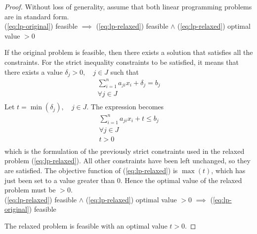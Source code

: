 \documentclass[preview,border=12pt,varwidth]{report}
\begin{document}
\begin{proof}
    Without loss of generality, assume that both linear programming problems are in standard form.
\\

    (\autoref{eq:lp-original}) feasible $\implies$ (\autoref{eq:lp-relaxed}) feasible $\land$  (\autoref{eq:lp-relaxed}) optimal value $> 0$

    If the original problem is feasible, then there exists a solution that satisfies all the constraints.
    For the strict inequality constraints to be satisfied, it means that there exists a value $\delta_j > 0, \quad j \in J$ such that
    \begin{align*}
        \sum_{i=1}^{n} a_{ji}x_{i} + \delta_j = b_j \\
        \forall j \in J                             \\
    \end{align*}
    Let $t = \min(\delta_j), \quad j \in J$.
    The expression becomes
    \begin{align*}
        \sum_{i=1}^{n} a_{ji}x_{i} + t \le b_j \\
        \forall j \in J                        \\
        t > 0                                  \\
    \end{align*}
    which is the formulation of the previously strict constraints used in the relaxed problem (\autoref{eq:lp-relaxed}).
    All other constraints have been left unchanged, so they are satisfied.
    The objective function of (\autoref{eq:lp-relaxed}) is $\max(t)$, which has just been set to a value greater than $0$.
    Hence the optimal value of the relaxed problem must be $> 0$.
    \\

    (\autoref{eq:lp-relaxed}) feasible $\land$  (\autoref{eq:lp-relaxed}) optimal value $> 0$ $\implies$ (\autoref{eq:lp-original}) feasible
    
    The relaxed problem is feasible with an optimal value $t > 0$.

\end{proof}
\end{document}
